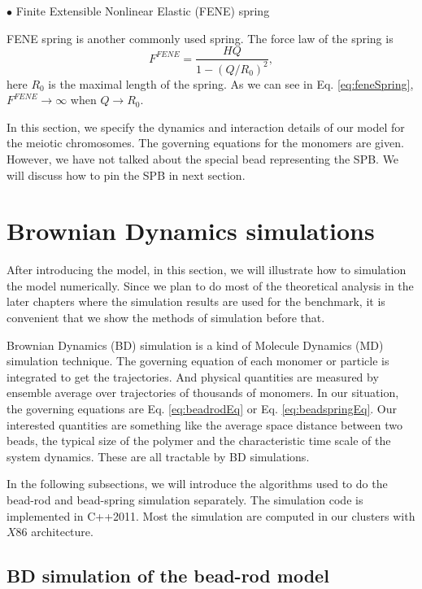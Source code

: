 $\bullet$ Finite Extensible Nonlinear Elastic (FENE) spring

FENE spring is another commonly used spring. The force law of the spring is
\begin{equation}
    \label{eq:feneSpring}
    F^{FENE} = \frac{H Q}{1-(Q/R_0)^2},
\end{equation}
here $R_0$ is the maximal length of the spring. As we can see in Eq. \eqref{eq:feneSpring}, $F^{FENE}\rightarrow\infty$ when $Q\rightarrow R_0$. 


In this section, we specify the dynamics and interaction details of our model for the meiotic chromosomes. The governing equations for the monomers are given. However, we have not talked about the special bead representing the SPB. We will discuss how to pin the SPB in next section.


\section{Brownian Dynamics simulations}
\label{sec:brownian_dynamics_simulations}
After introducing the model, in this section, we will illustrate how to simulation the model numerically. Since we plan to do most of the theoretical analysis in the later chapters where the simulation results are used for the benchmark, it is convenient that we show the methods of simulation before that. 

Brownian Dynamics (BD) simulation is a kind of Molecule Dynamics (MD) simulation technique. The governing equation of each monomer or particle is integrated to get the trajectories. And physical quantities are measured by ensemble average over trajectories of thousands of monomers. In our situation, the governing equations are Eq. \eqref{eq:beadrodEq} or Eq. \eqref{eq:beadspringEq}. Our interested quantities are something like the average space distance between two beads, the typical size of the polymer and the characteristic time scale of the system dynamics. These are all tractable by BD simulations. 

In the following subsections, we will introduce the algorithms used to do the bead-rod and bead-spring simulation separately. The simulation code is implemented in C++2011. Most the simulation are computed in our clusters with $X86$ architecture.

\subsection{BD simulation of the bead-rod model}
\label{sub:bd_of_bead_rod_model}

